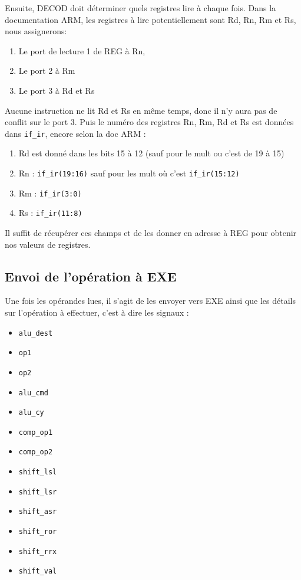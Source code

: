 \documentclass{article}
\begin{document}
Ensuite, DECOD doit déterminer quels registres lire à chaque fois.
Dans la documentation ARM, les registres à lire potentiellement sont Rd, Rn, Rm et Rs,
nous assignerons:
\begin{enumerate}
  \item Le port de lecture 1 de REG     à Rn,
  \item Le port 2 à Rm
  \item Le port 3 à Rd et Rs
\end{enumerate}
Aucune instruction ne lit Rd et Rs en même temps, donc il n'y aura pas de conflit sur le port 3.
Puis le numéro des registres Rn, Rm, Rd et Rs est données dans \texttt{if\_ir}, encore selon la doc ARM :
\begin{enumerate}
  \item Rd est donné dans les bits 15 à 12 (sauf pour le mult ou c'est de 19 à 15)
  \item Rn : \texttt{if\_ir(19:16)} sauf pour les mult où c'est \texttt{if\_ir(15:12)}
  \item Rm : \texttt{if\_ir(3:0)}
  \item Rs : \texttt{if\_ir(11:8)}
\end{enumerate}
Il suffit de récupérer ces champs et de les donner en adresse à REG pour obtenir nos valeurs de registres.



\subsection{Envoi de l'opération à EXE}

Une fois les opérandes lues, il s'agit de les envoyer vers EXE ainsi que les détails
sur l'opération à effectuer, c'est à dire les signaux :
\begin{itemize}
  \item \texttt{alu\_dest}
  \item \texttt{op1}
  \item \texttt{op2}
  \item \texttt{alu\_cmd}
  \item \texttt{alu\_cy}
  \item \texttt{comp\_op1}
  \item \texttt{comp\_op2}
  \item \texttt{shift\_lsl}
  \item \texttt{shift\_lsr}
  \item \texttt{shift\_asr}
  \item \texttt{shift\_ror}
  \item \texttt{shift\_rrx}
  \item \texttt{shift\_val}
\end{itemize}
\end{document}
